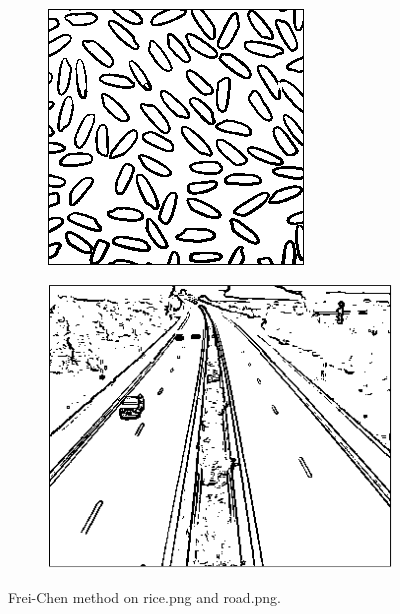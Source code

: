 \documentclass{article}
\begin{document}
\begin{figure}
        \centering
        \begin{subfigure}[b]{0.4\textwidth}
            \includegraphics[width=\textwidth]{Images/rice_frei_chen.png}
        \end{subfigure}
        \begin{subfigure}[b]{0.4\textwidth}
            \includegraphics[width=\textwidth]{Images/road_frei_chen.png}
        \end{subfigure}
        \caption{Frei-Chen method on \textsf{rice.png} and \textsf{road.png}.}
        \label{fig:freichen_r}
\end{figure}
\end{document}
